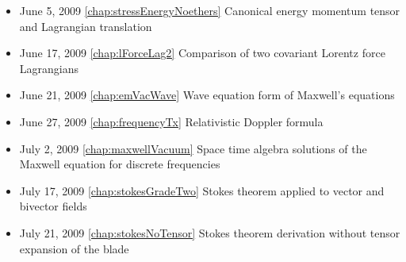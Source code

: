 \begin{itemize}
\item June 5, 2009 \ref{chap:stressEnergyNoethers} Canonical energy momentum tensor and Lagrangian translation

\item June 17, 2009 \ref{chap:lForceLag2} Comparison of two covariant Lorentz force Lagrangians

\item June 21, 2009 \ref{chap:emVacWave} Wave equation form of Maxwell's equations

\item June 27, 2009 \ref{chap:frequencyTx} Relativistic Doppler formula

\item July 2, 2009 \ref{chap:maxwellVacuum} Space time algebra solutions of the Maxwell equation for discrete frequencies

\item July 17, 2009 \ref{chap:stokesGradeTwo} Stokes theorem applied to vector and bivector fields

\item July 21, 2009 \ref{chap:stokesNoTensor} Stokes theorem derivation without tensor expansion of the blade

\end{itemize}
